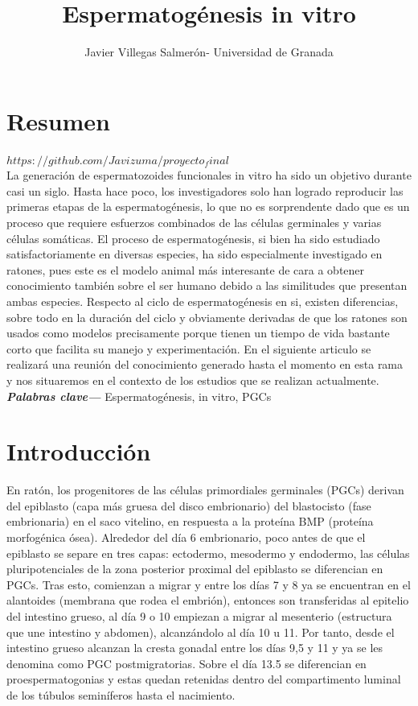 \documentclass[a4paper,11pt]{article}
\providecommand{\keywords}[1]{\textbf{\textit{Palabras clave---}} #1}
\begin{document}
\title{Espermatogénesis in vitro}
\author{Javier Villegas Salmerón- Universidad de Granada}
\maketitle
\section{Resumen}
$https://github.com/Javizuma/proyecto_final$\\
La generación de espermatozoides funcionales in vitro ha sido un objetivo durante casi un siglo. Hasta hace poco, los investigadores solo han logrado reproducir las primeras etapas de la espermatogénesis, lo que no es sorprendente dado que es un proceso que requiere esfuerzos combinados de las células germinales y varias células somáticas.
El proceso de espermatogénesis, si bien ha sido estudiado satisfactoriamente en diversas especies, ha sido especialmente investigado en ratones, pues este es el modelo animal  más interesante de cara a obtener conocimiento también sobre el ser humano debido a las similitudes que presentan ambas especies. Respecto al ciclo de espermatogénesis en si, existen diferencias, sobre todo en la duración del ciclo y obviamente derivadas de que los ratones son usados como modelos  precisamente porque tienen un tiempo de vida bastante corto que facilita su manejo y experimentación. 
En el siguiente articulo se realizará una reunión del conocimiento generado hasta el momento en esta rama y nos situaremos en el contexto de los estudios que se realizan actualmente. 
\keywords{Espermatogénesis, in vitro, PGCs}
\section{Introducción}
En ratón, los progenitores de las células primordiales germinales (PGCs) derivan del epiblasto (capa más gruesa del disco embrionario) del blastocisto (fase embrionaria) en el saco vitelino, en respuesta a la proteína BMP (proteína morfogénica ósea). Alrededor del día 6 embrionario, poco antes de que el epiblasto se separe en tres capas: ectodermo, mesodermo y endodermo, las células pluripotenciales de la zona posterior proximal del epiblasto se diferencian en PGCs. Tras esto, comienzan a migrar y entre los días 7 y 8 ya se encuentran en el alantoides (membrana que rodea el embrión), entonces son transferidas al epitelio del intestino grueso,  al día 9 o 10 empiezan a migrar al mesenterio (estructura que une intestino y abdomen), alcanzándolo al día 10 u 11. Por tanto, desde el intestino grueso alcanzan la cresta gonadal entre los días 9,5 y 11 y ya se les denomina como PGC postmigratorias. Sobre el día 13.5 se diferencian en proespermatogonias y estas quedan retenidas dentro del compartimento luminal de los túbulos seminíferos hasta el nacimiento. 
\end{document}
